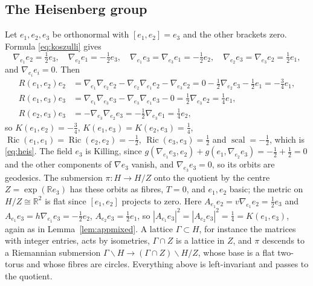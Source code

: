 \documentclass[11pt,reqno]{amsart}
\theoremstyle{plain}
\theoremstyle{definition}
\newcommand{\Ric}{\operatorname{Ric}}
\newcommand{\scal}{\operatorname{scal}}
\newcommand{\R}{\mathbb{R}}
\begin{document}
\subsection*{The Heisenberg group}
Let $e_1,e_2,e_3$ be orthonormal with $[e_1,e_2]=e_3$ and the other brackets zero. Formula \eqref{eq:koszulli} gives
\[
\nabla_{e_1}e_2=\tfrac12e_3,\quad \nabla_{e_2}e_1=-\tfrac12e_3,\quad \nabla_{e_1}e_3=\nabla_{e_3}e_1=-\tfrac12e_2,\quad \nabla_{e_2}e_3=\nabla_{e_3}e_2=\tfrac12e_1,
\]
and $\nabla_{e_i}e_i=0$. Then
\begin{align*}
R(e_1,e_2)e_2&=\nabla_{e_1}\nabla_{e_2}e_2-\nabla_{e_2}\nabla_{e_1}e_2-\nabla_{e_3}e_2=0-\tfrac12\nabla_{e_2}e_3-\tfrac12e_1=-\tfrac34e_1,\\
R(e_1,e_3)e_3&=\nabla_{e_1}\nabla_{e_3}e_3-\nabla_{e_3}\nabla_{e_1}e_3-0=\tfrac12\nabla_{e_3}e_2=\tfrac14e_1,\\
R(e_2,e_3)e_3&=-\nabla_{e_3}\nabla_{e_2}e_3=-\tfrac12\nabla_{e_3}e_1=\tfrac14e_2,
\end{align*}
so $K(e_1,e_2)=-\tfrac34$, $K(e_1,e_3)=K(e_2,e_3)=\tfrac14$, $\Ric(e_1,e_1)=\Ric(e_2,e_2)=-\tfrac12$, $\Ric(e_3,e_3)=\tfrac12$ and $\scal=-\tfrac12$, which is \eqref{eq:heis}. The field $e_3$ is Killing, since $g(\nabla_{e_1}e_3,e_2)+g(e_1,\nabla_{e_2}e_3)=-\tfrac12+\tfrac12=0$ and the other components of $\nabla e_3$ vanish, and $\nabla_{e_3}e_3=0$, so its orbits are geodesics. The submersion $\pi\colon H\to H/Z$ onto the quotient by the centre $Z=\exp(\R e_3)$ has these orbits as fibres, $T=0$, and $e_1,e_2$ basic; the metric on $H/Z\cong\R^2$ is flat since $[e_1,e_2]$ projects to zero. Here $A_{e_1}e_2=v\nabla_{e_1}e_2=\tfrac12e_3$ and $A_{e_1}e_3=h\nabla_{e_1}e_3=-\tfrac12e_2$, $A_{e_2}e_3=\tfrac12e_1$, so $|A_{e_1}e_3|^2=|A_{e_2}e_3|^2=\tfrac14=K(e_1,e_3)$, again as in Lemma~\ref{lem:appmixed}. A lattice $\Gamma\subset H$, for instance the matrices with integer entries, acts by isometries, $\Gamma\cap Z$ is a lattice in $Z$, and $\pi$ descends to a Riemannian submersion $\Gamma\backslash H\to(\Gamma\cap Z)\backslash H/Z$, whose base is a flat two-torus and whose fibres are circles. Everything above is left-invariant and passes to the quotient.
\end{document}
